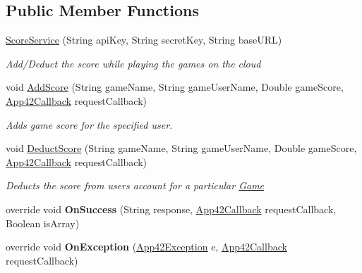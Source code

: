 \subsection*{Public Member Functions}
\begin{DoxyCompactItemize}
\item 
\hyperlink{classcom_1_1shephertz_1_1app42_1_1paas_1_1sdk_1_1windows_1_1game_1_1_score_service_a8c2711659bb592c0b406c7b20b6deaf3}{Score\+Service} (String api\+Key, String secret\+Key, String base\+U\+R\+L)
\begin{DoxyCompactList}\small\item\em Add/\+Deduct the score while playing the games on the cloud \end{DoxyCompactList}\item 
void \hyperlink{classcom_1_1shephertz_1_1app42_1_1paas_1_1sdk_1_1windows_1_1game_1_1_score_service_a930e66072034f5a8124b1aea1251df6f}{Add\+Score} (String game\+Name, String game\+User\+Name, Double game\+Score, \hyperlink{interfacecom_1_1shephertz_1_1app42_1_1paas_1_1sdk_1_1windows_1_1_app42_callback}{App42\+Callback} request\+Callback)
\begin{DoxyCompactList}\small\item\em Adds game score for the specified user. \end{DoxyCompactList}\item 
void \hyperlink{classcom_1_1shephertz_1_1app42_1_1paas_1_1sdk_1_1windows_1_1game_1_1_score_service_ad5e53e3bcc6e6557a7d46a19c3d17c4b}{Deduct\+Score} (String game\+Name, String game\+User\+Name, Double game\+Score, \hyperlink{interfacecom_1_1shephertz_1_1app42_1_1paas_1_1sdk_1_1windows_1_1_app42_callback}{App42\+Callback} request\+Callback)
\begin{DoxyCompactList}\small\item\em Deducts the score from users account for a particular \hyperlink{classcom_1_1shephertz_1_1app42_1_1paas_1_1sdk_1_1windows_1_1game_1_1_game}{Game} \end{DoxyCompactList}\item 
\hypertarget{classcom_1_1shephertz_1_1app42_1_1paas_1_1sdk_1_1windows_1_1game_1_1_score_service_ae6ed8120161d7a76dacdd49ff6c9105f}{override void {\bfseries On\+Success} (String response, \hyperlink{interfacecom_1_1shephertz_1_1app42_1_1paas_1_1sdk_1_1windows_1_1_app42_callback}{App42\+Callback} request\+Callback, Boolean is\+Array)}\label{classcom_1_1shephertz_1_1app42_1_1paas_1_1sdk_1_1windows_1_1game_1_1_score_service_ae6ed8120161d7a76dacdd49ff6c9105f}

\item 
\hypertarget{classcom_1_1shephertz_1_1app42_1_1paas_1_1sdk_1_1windows_1_1game_1_1_score_service_a38f84beecb03fa8fc4e1e32d41b91b4d}{override void {\bfseries On\+Exception} (\hyperlink{classcom_1_1shephertz_1_1app42_1_1paas_1_1sdk_1_1windows_1_1_app42_exception}{App42\+Exception} e, \hyperlink{interfacecom_1_1shephertz_1_1app42_1_1paas_1_1sdk_1_1windows_1_1_app42_callback}{App42\+Callback} request\+Callback)}\label{classcom_1_1shephertz_1_1app42_1_1paas_1_1sdk_1_1windows_1_1game_1_1_score_service_a38f84beecb03fa8fc4e1e32d41b91b4d}

\end{DoxyCompactItemize}

